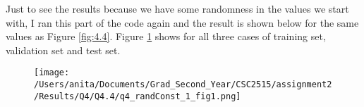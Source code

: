 \documentclass[10pt]{article}
\begin{document}
Just to see the results because we have some randomness in the values we start with, I ran this part of the code again and the result is shown below for the same values as Figure \ref{fig:4.4}.
Figure \ref{fig:err_rate} shows for all three cases of training set, validation set and test set.
\begin{figure}[H]
	\centering
	\texttt{[image: /Users/anita/Documents/Grad\_Second\_Year/CSC2515/assignment2/Results/Q4/Q4.4/q4\_randConst\_1\_fig1.png]}
	\caption{}
	\label{fig:err_rate}
\end{figure}
\end{document}
